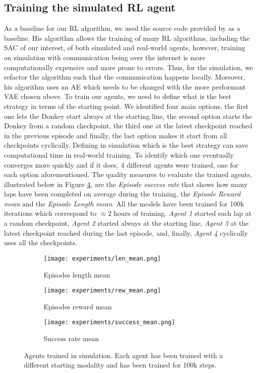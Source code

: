 \subsection{Training the simulated RL agent}
As a baseline for our RL algorithm, we used the source code provided by \citet{learning-to-drive-in-5-minutes} as a baseline. His algorithm allows the training of many RL algorithms, including the SAC of our interest, of both simulated and real-world agents, however, training on simulation with communication being over the internet is more computationally expensive and more prone to errors. Thus, for the simulation, we refactor the algorithm such that the communication happens locally. Moreover, his algorithm uses an AE which needs to be changed with the more performant VAE chosen above. To train our agents, we need to define what is the best strategy in terms of the starting point. We identified four main options, the first one lets the Donkey start always at the starting line, the second option starts the Donkey from a random checkpoint, the third one at the latest checkpoint reached in the previous episode and finally, the last option makes it start from all checkpoints cyclically. Defining in simulation which is the best strategy can save computational time in real-world training. To identify which one eventually converges more quickly and if it does, 4 different agents were trained, one for each option aforementioned. The quality measures to evaluate the trained agents, illustrated below in Figure \ref{fig:agentresults}, are the \textit{Episode success rate} that shows how many laps have been completed on average during the training, the \textit{Episode Reward mean} and the \textit{Episode Length mean}. All the models have been trained for 100k iterations which correspond to $\approx 2$ hours of training. \textit{ Agent 1} started each lap at a random checkpoint,\textit{ Agent 2} started always at the starting line,\textit{ Agent 3} at the latest checkpoint reached during the last episode, and, finally,\textit{ Agent 4} cyclically uses all the checkpoints.
\begin{figure}[h]
  \centering
  \begin{subfigure}{.45\linewidth}
      \centering
      \texttt{[image: experiments/len\_mean.png]}
      \caption{Episodes length mean}\label{fig:len}
  \end{subfigure}%
      \hfill
  \begin{subfigure}{.45\linewidth}
      \centering
      \texttt{[image: experiments/rew\_mean.png]}
      \caption{Episodes reward mean}\label{fig:rew}
  \end{subfigure}
  
  \bigskip
  \begin{subfigure}{.45\linewidth}
    \centering
    \texttt{[image: experiments/success\_mean.png]}
    \caption{Success rate mean}\label{fig:succ}
  \end{subfigure} 
  \caption{Agents trained in simulation. Each agent has been trained with a different starting modality and has been trained for 100k steps.}
  \label{fig:agentresults}
\end{figure}
